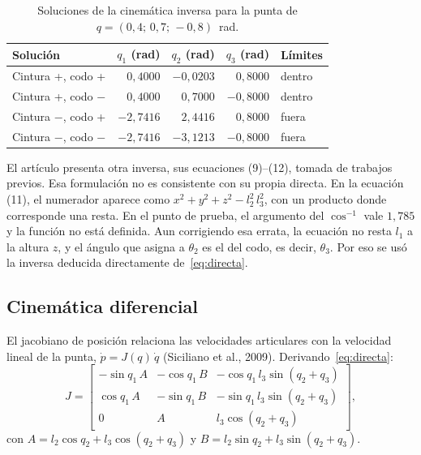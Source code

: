 \documentclass[11pt,a4paper]{article}
\begin{document}
\begin{table}[ht]
\centering
\caption{Soluciones de la cinemática inversa para la punta de \(q=(0{,}4;\,0{,}7;\,-0{,}8)\)~rad.}
\label{tab:ik}
\begin{tabular}{@{}lrrrl@{}}
\toprule
Solución & \(q_1\) (rad) & \(q_2\) (rad) & \(q_3\) (rad) & Límites \\
\midrule
Cintura +, codo + & \(0{,}4000\) & \(-0{,}0203\) & \(0{,}8000\) & dentro \\
Cintura +, codo \(-\) & \(0{,}4000\) & \(0{,}7000\) & \(-0{,}8000\) & dentro \\
Cintura \(-\), codo + & \(-2{,}7416\) & \(2{,}4416\) & \(0{,}8000\) & fuera \\
Cintura \(-\), codo \(-\) & \(-2{,}7416\) & \(-3{,}1213\) & \(-0{,}8000\) & fuera \\
\bottomrule
\end{tabular}
\end{table}

El artículo presenta otra inversa, sus ecuaciones (9)--(12), tomada de trabajos previos. Esa formulación no es consistente con su propia directa. En la ecuación (11), el numerador aparece como \(x^2+y^2+z^2-l_2^2\,l_3^2\), con un producto donde corresponde una resta. En el punto de prueba, el argumento del \(\cos^{-1}\) vale \(1{,}785\) y la función no está definida. Aun corrigiendo esa errata, la ecuación no resta \(l_1\) a la altura \(z\), y el ángulo que asigna a \(\theta_2\) es el del codo, es decir, \(\theta_3\). Por eso se usó la inversa deducida directamente de~\eqref{eq:directa}.

\subsection{Cinemática diferencial}

El jacobiano de posición relaciona las velocidades articulares con la velocidad lineal de la punta, \(\dot p=J(q)\,\dot q\) (Siciliano et al., 2009). Derivando~\eqref{eq:directa}:
\begin{equation}
J=\begin{bmatrix}
-\sin q_1\, A & -\cos q_1\, B & -\cos q_1\, l_3\sin(q_2+q_3)\\
\cos q_1\, A & -\sin q_1\, B & -\sin q_1\, l_3\sin(q_2+q_3)\\
0 & A & l_3\cos(q_2+q_3)
\end{bmatrix},
\end{equation}
con \(A=l_2\cos q_2+l_3\cos(q_2+q_3)\) y \(B=l_2\sin q_2+l_3\sin(q_2+q_3)\).
\end{document}
